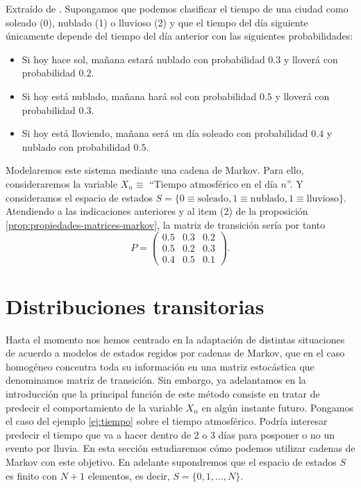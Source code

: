 \begin{ejemplo}
    \label{ej:tiempo}
    Extraído de \cite[Ch. 2, Example 2.3]{kulkarni-2012}. Supongamos que podemos clasificar el tiempo de una ciudad como soleado (0), nublado (1) o lluvioso (2) y que el tiempo del día siguiente únicamente depende del tiempo del día anterior con las siguientes probabilidades:
    \begin{itemize}
        \item Si hoy hace sol, mañana estará nublado con probabilidad $0.3$ y lloverá con probabilidad $0.2$.
        \item Si hoy está nublado, mañana hará sol con probabilidad $0.5$ y lloverá con probabilidad $0.3$.
        \item Si hoy está lloviendo, mañana será un día soleado con probabilidad $0.4$ y nublado con probabilidad $0.5$.
    \end{itemize}

    Modelaremos este sistema mediante una cadena de Markov. Para ello, consideraremos la variable $X_n \equiv$ ``Tiempo atmosférico en el día $n$''. Y consideramos el espacio de estados $S = \{ 0\equiv\text{soleado}, 1\equiv\text{nublado}, 1\equiv\text{lluvioso}\}$. Atendiendo a las indicaciones anteriores y al item (2) de la proposición \ref{prop:propiedades-matrices-markov}, la matriz de transición sería por tanto
    $$ P = \begin{pmatrix}
        0.5 & 0.3 & 0.2 \\
        0.5 & 0.2 & 0.3 \\
        0.4 & 0.5 & 0.1
    \end{pmatrix}.
    $$

\end{ejemplo}

\section{Distribuciones transitorias}

Hasta el momento nos hemos centrado en la adaptación de distintas situaciones de acuerdo a modelos de estados regidos por cadenas de Markov, que en el caso homogéneo concentra toda su información en una matriz estocástica que denominamos matriz de transición. Sin embargo, ya adelantamos en la introducción que la principal función de este método consiste en tratar de predecir el comportamiento de la variable $X_n$ en algún instante futuro. Pongamos el caso del ejemplo \ref{ej:tiempo} sobre el tiempo atmosférico. Podría interesar predecir el tiempo que va a hacer dentro de 2 o 3 días para posponer o no un evento por lluvia. En esta sección estudiaremos cómo podemos utilizar cadenas de Markov con este objetivo. En adelante supondremos que el espacio de estados $S$ es finito con $N+1$ elementos, es decir, $S=\{0,1,\dots,N\}$.

